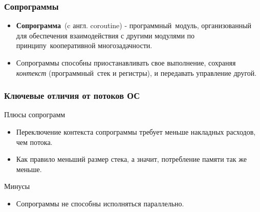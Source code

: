 \begin{frame}
	\frametitle{Сопрограммы}
	\begin{itemize}
		\item \textbf{Сопрограмма} (c англ. coroutine) - программный модуль, организованный для обеспечения взаимодействия с другими модулями по принципу кооперативной многозадачности.
		
		\item Сопрограммы способны приостанавливать свое выполнение, сохраняя \textit{контекст} 
		(программный стек и регистры), и передавать управление другой.
	\end{itemize}
\end{frame}

\begin{frame}
	\frametitle{Ключевые отличия от потоков ОС}
	Плюсы сопрограмм
	\begin{itemize}
		\item Переключение контекста сопрограммы требует меньше накладных расходов, чем потока.
		\item Как правило меньший размер стека, а значит, потребление памяти так же меньше.
	\end{itemize}

	Минусы
	\begin{itemize}
		\item Сопрограммы не способны исполняться параллельно.
	\end{itemize}
\end{frame}

